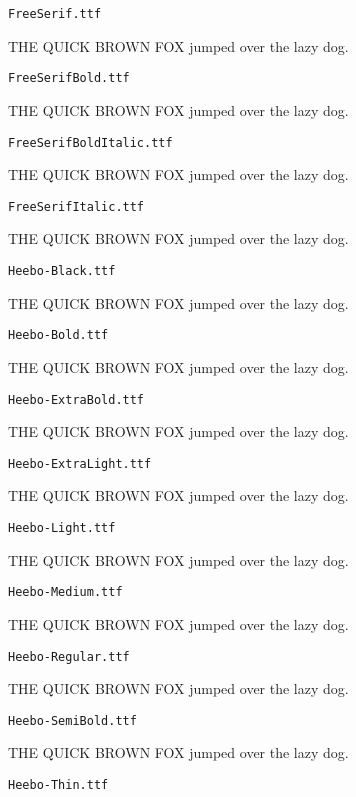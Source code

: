 \documentclass{article}
\begin{document}
\setmainfont[Extension=.ttf]{FreeSerif}
\noindent \verb!FreeSerif.ttf!

THE QUICK BROWN FOX jumped over the lazy dog.

\setmainfont[Extension=.ttf]{FreeSerifBold}
\noindent \verb!FreeSerifBold.ttf!

THE QUICK BROWN FOX jumped over the lazy dog.

\setmainfont[Extension=.ttf]{FreeSerifBoldItalic}
\noindent \verb!FreeSerifBoldItalic.ttf!

THE QUICK BROWN FOX jumped over the lazy dog.

\setmainfont[Extension=.ttf]{FreeSerifItalic}
\noindent \verb!FreeSerifItalic.ttf!

THE QUICK BROWN FOX jumped over the lazy dog.

\setmainfont[Extension=.ttf]{Heebo-Black}
\noindent \verb!Heebo-Black.ttf!

THE QUICK BROWN FOX jumped over the lazy dog.

\setmainfont[Extension=.ttf]{Heebo-Bold}
\noindent \verb!Heebo-Bold.ttf!

THE QUICK BROWN FOX jumped over the lazy dog.

\setmainfont[Extension=.ttf]{Heebo-ExtraBold}
\noindent \verb!Heebo-ExtraBold.ttf!

THE QUICK BROWN FOX jumped over the lazy dog.

\setmainfont[Extension=.ttf]{Heebo-ExtraLight}
\noindent \verb!Heebo-ExtraLight.ttf!

THE QUICK BROWN FOX jumped over the lazy dog.

\setmainfont[Extension=.ttf]{Heebo-Light}
\noindent \verb!Heebo-Light.ttf!

THE QUICK BROWN FOX jumped over the lazy dog.

\setmainfont[Extension=.ttf]{Heebo-Medium}
\noindent \verb!Heebo-Medium.ttf!

THE QUICK BROWN FOX jumped over the lazy dog.

\setmainfont[Extension=.ttf]{Heebo-Regular}
\noindent \verb!Heebo-Regular.ttf!

THE QUICK BROWN FOX jumped over the lazy dog.

\setmainfont[Extension=.ttf]{Heebo-SemiBold}
\noindent \verb!Heebo-SemiBold.ttf!

THE QUICK BROWN FOX jumped over the lazy dog.

\setmainfont[Extension=.ttf]{Heebo-Thin}
\noindent \verb!Heebo-Thin.ttf!
\end{document}
